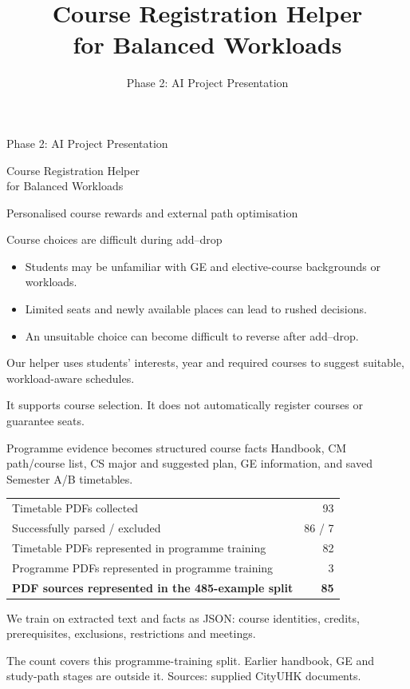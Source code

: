 \documentclass[aspectratio=169,11pt]{beamer}
\title{Course Registration Helper\\for Balanced Workloads}
\subtitle{Phase 2: AI Project Presentation}
\author{}
\date{}
\newcommand{\smallnote}[1]{\par{\footnotesize\color{muted}#1\par}}
\begin{document}
\begin{frame}[plain]
\vspace{10mm}
{\color{accent}\large Phase 2: AI Project Presentation\par}
\vspace{5mm}
{Course Registration Helper\\for Balanced Workloads\par}
\vspace{7mm}
{\large Personalised course rewards and external path optimisation\par}
\end{frame}

\begin{frame}{Course choices are difficult during add--drop}
\begin{itemize}\setlength{\itemsep}{7pt}
\item Students may be unfamiliar with GE and elective-course backgrounds or workloads.
\item Limited seats and newly available places can lead to rushed decisions.
\item An unsuitable choice can become difficult to reverse after add--drop.
\end{itemize}
\vspace{3mm}
Our helper uses students' interests, year and required courses to suggest suitable, workload-aware schedules.
\smallnote{It supports course selection. It does not automatically register courses or guarantee seats.}
\end{frame}

\begin{frame}{Programme evidence becomes structured course facts}
Handbook, CM path/course list, CS major and suggested plan, GE information, and saved Semester A/B timetables.
\vspace{2mm}
\begin{tabular}{L{9.4cm}r}
\toprule
Timetable PDFs collected & 93\\
Successfully parsed / excluded & 86 / 7\\
Timetable PDFs represented in programme training & 82\\
Programme PDFs represented in programme training & 3\\\midrule
\textbf{PDF sources represented in the 485-example split} & \textbf{85}\\
\bottomrule
\end{tabular}\par
\vspace{2mm}
We train on extracted text and facts as JSON: course identities, credits, prerequisites, exclusions, restrictions and meetings.
\smallnote{The count covers this programme-training split. Earlier handbook, GE and study-path stages are outside it. Sources: supplied CityUHK documents.}
\end{frame}
\end{document}

